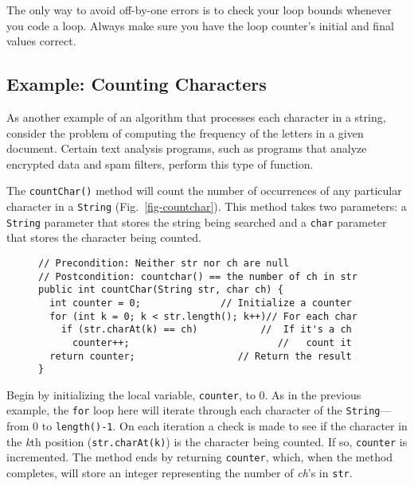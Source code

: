 The only way to avoid off-by-one errors is to check your loop bounds
whenever you code a loop.  Always make sure you have the loop counter's
initial and final values correct.


\subsection{Example: Counting Characters}
\noindent As another example of an algorithm that processes
each character in a string, consider the problem of computing the
frequency of the letters in a given document.  Certain text analysis
programs, such as programs that analyze encrypted data and spam
filters, perform this type of function. 


The {\tt countChar()} method will count the number of occurrences of
any particular character in a {\tt String}
(Fig.~\ref{fig-countchar}).  This method takes two parameters: a
{\tt String} parameter that stores the string being searched and a
{\tt char} parameter that stores the character being counted.

\begin{figure}[h!]
\jjjprogstart
\begin{jjjlisting}
\begin{lstlisting}
// Precondition: Neither str nor ch are null
// Postcondition: countchar() == the number of ch in str
public int countChar(String str, char ch) {
  int counter = 0;              // Initialize a counter
  for (int k = 0; k < str.length(); k++)// For each char
    if (str.charAt(k) == ch)           //  If it's a ch
      counter++;                          //   count it
  return counter;                  // Return the result
}
\end{lstlisting}
\end{jjjlisting}
\end{figure}

Begin by initializing the local variable, {\tt counter}, to
0. As in the previous example, the {\tt for} loop here will iterate through
each character of the {\tt String}---from 0 to {\tt length()-1}.  On
each iteration a check is made to see if the character in the {\it k}th
position ({\tt str.charAt(k)}) is the character being counted.  If so,
{\tt counter} is incremented.  The method ends by returning
{\tt counter}, which, when the method completes, will store an integer
representing the number of {\it ch}'s in {\tt str}.


